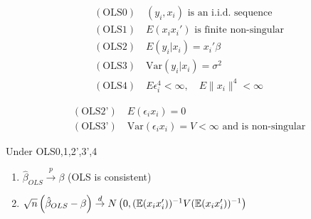 \documentclass[DIV=14,titlepage=false]{scrreprt}
\begin{document}
\begin{minipage}{.45\textwidth}
    \begin{align*}
        &(\text{OLS0}) \quad (y_i, x_i)\text{ is an i.i.d. sequence} \\
        &(\text{OLS1}) \quad E(x_i x_i') \text{ is finite non-singular} \\
        &(\text{OLS2}) \quad E(y_i|x_i) = x_i'\beta \\
        &(\text{OLS3}) \quad \text{Var}(y_i|x_i)= \sigma^2 \\
        &(\text{OLS4}) \quad E\epsilon_i^4 < \infty, \quad E\|x_i\|^4 < \infty
    \end{align*}
\end{minipage}
\begin{minipage}{.55\textwidth}
    \begin{align*}
        &(\text{OLS2'}) \quad E(\epsilon_ix_i)= 0 \\
        &(\text{OLS3'}) \quad \text{Var}(\epsilon_ix_i)=V<\infty \text{ and is non-singular} 
    \end{align*}
\end{minipage}

\begin{theorem}
    Under OLS0,1,2',3',4
    \begin{enumerate}
        \item $\hat \beta_{OLS} \overset{p}{\to} \beta$ (OLS is consistent)
        \item $\sqrt{n}\left(\hat \beta_{OLS} -\beta\right) \overset{d}{\to} N\left(0,(\mathbb{E}(x_ix_i'))^{-1}V (\mathbb{E}(x_ix_i'))^{-1}\right)$
    \end{enumerate}
\end{theorem}
\end{document}
